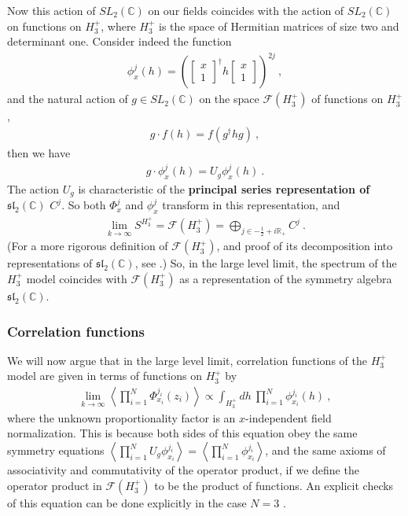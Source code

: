 \documentclass[12pt, a4paper, notitlepage, twoside]{report}
\numberwithin{equation}{section}
\theoremstyle{break}
\begin{document}
Now this action of $SL_2({\mathbb{C}})$ on our fields coincides with the action of $SL_2({\mathbb{C}})$ on functions on $H_3^+$, where \textbf{\boldmath $H_3^+$} is the space of Hermitian matrices of size two and determinant one.
Consider indeed the function
\begin{align}
 \phi^j_{x}(h) = \left(\begin{bmatrix}
                                x \\ 1
                               \end{bmatrix}^\dagger 
h \begin{bmatrix}
   x \\ 1 
  \end{bmatrix}
 \right)^{2j}\ ,
\end{align}
and the natural action of $g\in SL_2({\mathbb{C}})$ on the space $\mathcal{F}(H_3^+)$ of functions on $H_3^+$,
\begin{align}
 g\cdot f(h) = f(g^\dagger h g)\ ,
\end{align}
then we have 
\begin{align}
 g\cdot \phi^j_{x}(h) = U_g \phi^j_{x}(h)\ .
\end{align}
The action $U_g$ is characteristic of the \textbf{\boldmath principal series representation of $\mathfrak{sl}_2({\mathbb{C}})$} $C^j$. 
So both $\Phi^j_x$ and $\phi^j_x$ transform in this representation, and 
\begin{align}
 \underset{k\to\infty}{\lim} S^{H_3^+} =  \mathcal{F}(H_3^+) = \bigoplus_{j\in -\frac12+i{\mathbb{R}}_+} C^j\ .
\end{align}
(For a more rigorous definition of $\mathcal{F}(H_3^+)$, and proof of its decomposition into representations of $\mathfrak{sl}_2({\mathbb{C}})$, see \cite{tes97b}.)
So, in the large level limit, the spectrum of the $H_3^+$ model coincides with $\mathcal{F}(H_3^+)$ as a representation of the symmetry algebra $\mathfrak{sl}_2({\mathbb{C}})$. 

\subsubsection{Correlation functions}

We will now argue that in the large level limit, correlation functions of the $H_3^+$ model are given in terms of functions on $H_3^+$ by 
\begin{align}
 \underset{k\to \infty}{\lim} \left\langle \prod_{i=1}^N \Phi^{j_i}_{x_i}(z_i)\right\rangle \propto \int_{H_3^+} dh\ \prod_{i=1}^N \phi^{j_i}_{x_i}(h)\ , 
\end{align}
where the unknown proportionality factor is an $x$-independent field normalization.
This is because both sides of this equation obey the same symmetry equations $\left<\prod_{i=1}^N U_g \phi^{j_i}_{x_i} \right> = \left<\prod_{i=1}^N \phi^{j_i}_{x_i} \right>$, and the same axioms of associativity and commutativity of the operator product, if we define the operator product in $\mathcal{F}(H_3^+)$ to be the product of functions. 
An explicit checks of this equation can be done explicitly in the case $N=3$ \cite{tes97b}.
\end{document}
